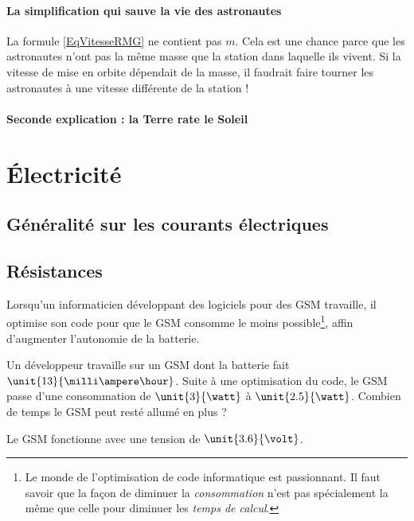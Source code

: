 \documentclass[a4paper,12pt]{book}
\theoremstyle{mes_exemples}	\newtheorem{exemple}[numtho]{Exemple}
\theoremstyle{mes_tho}
\begin{document}
\subsubsection{La simplification qui sauve la vie des astronautes}

La formule \eqref{EqVitesseRMG} ne contient pas $m$. Cela est une chance parce que les astronautes n'ont pas la même masse que la station dans laquelle ils vivent. Si la vitesse de mise en orbite dépendait de la masse, il faudrait faire tourner les astronautes à une vitesse différente de la station ! 

\subsubsection{Seconde explication : la Terre \og rate\fg{} le Soleil}





\chapter{Électricité}


\section{Généralité sur les courants électriques}

\section{Résistances}

\begin{exercice}
	Lorsqu'un informaticien développant des logiciels pour des GSM travaille, il optimise son code pour que le GSM consomme le moins possible\footnote{Le monde de l'optimisation de code informatique est passionnant. Il faut savoir que la façon de diminuer la \emph{consommation} n'est pas spécialement la même que celle pour diminuer les \emph{temps de calcul}.}, affin d'augmenter l'autonomie de la batterie.
	
	Un développeur travaille sur un GSM dont la batterie fait $\unit{13}{\milli\ampere\hour}$. Suite à une optimisation du code, le GSM passe d'une consommation de $\unit{3}{\watt}$ à $\unit{2.5}{\watt}$. Combien de temps le GSM peut resté allumé en plus ?
	
	Le GSM fonctionne avec une tension de $\unit{3.6}{\volt}$.
\end{exercice}
\end{document}
